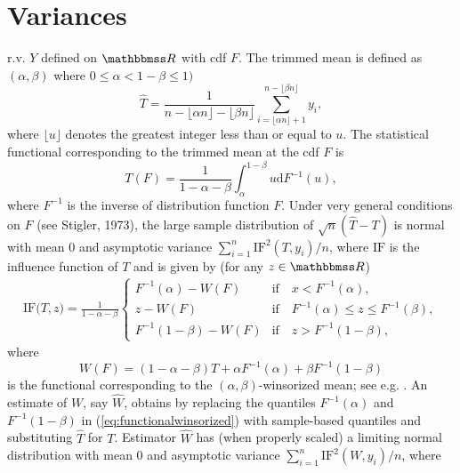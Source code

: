 \documentclass[a4paper,11pt]{scrreprt}
\theoremstyle{remark}
\begin{document}
\section{Variances}
r.v. $Y$ defined on $\R$ with cdf $F$. The trimmed mean is defined as $(\alpha,\beta)$ where $0 \leq \alpha < 1- \beta \leq 1)$
\begin{equation*}
   \widehat{T} = \frac{1}{n - \lfloor \alpha n\rfloor - \lfloor \beta n\rfloor}\sum_{i= \lfloor \alpha n \rfloor + 1}^{n - \lfloor \beta n \rfloor} y_i,
\end{equation*}
\noindent where $\lfloor u \rfloor$ denotes the greatest integer less than or equal to $u$. The statistical functional corresponding to the trimmed mean at the cdf $F$ is
\begin{equation*}
   T(F) = \frac{1}{1 - \alpha - \beta} \int_{\alpha}^{1-\beta} u \mathrm{d} F^{-1}(u), 
\end{equation*}
\noindent where $F^{-1}$ is the inverse of distribution function $F$. Under very general conditions on $F$ (see Stigler, 1973), the large sample distribution of $\sqrt{n}(\widehat{T} - T)$ is normal with mean 0 and asymptotic variance $\sum_{i=1}^n \mathrm{IF}^2(T,y_i)/n$, where $\mathrm{IF}$ is the influence function of $T$ and is given by (for any $z \in \R$) 
\begin{align*}
   \mathrm{IF}\big(T, z\big) = \frac{1}{1-\alpha - \beta}
   \begin{cases}
      F^{-1}(\alpha) - W(F) & \text{if} \quad x < F^{-1}(\alpha),\\
      z - W(F) & \text{if} \quad F^{-1}(\alpha) \leq z \leq F^{-1}(\beta),\\
      F^{-1}(1-\beta) - W(F) & \text{if} \quad z > F^{-1}(1-\beta), 
   \end{cases}
\end{align*}
\noindent where
\begin{equation}\label{eq:functionalwinsorized}
   W(F) = (1 - \alpha -\beta)T + \alpha F^{-1}(\alpha) + \beta F^{-1}(1-\beta)
\end{equation}
\noindent is the functional corresponding to the $(\alpha,\beta)$-winsorized mean; see e.g. \citet[][p. 58]{huber1981}. An estimate of $W$, say $\widehat{W}$, obtains by replacing the quantiles $F^{-1}(\alpha)$ and $F^{-1}(1-\beta)$ in (\ref{eq:functionalwinsorized}) with sample-based quantiles and substituting $\widehat{T}$ for $T$. Estimator $\widehat{W}$ has (when properly scaled) a limiting normal distribution with mean 0 and asymptotic variance $\sum_{i=1}^n \mathrm{IF}^2(W,y_i) / n$, where \citep[see e.g.][58--59]{huber1981}
\end{document}
